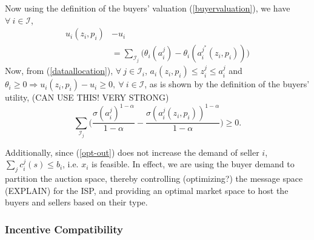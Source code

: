 \documentclass[12pt]{article}
\theoremstyle{definition}
\newcommand{\mcI}{\mathcal{I}}
\begin{document}
\begin{multicols}{2}
Now using the definition of
the buyers' valuation (\ref{buyervaluation}), we have $\forall \ i \in\mcI$,
\begin{align*}
    u_i(z_i,p_i) &- u_i \\
    &=\displaystyle\sum_{\mcI_j}\bigg(\theta_i(a_i^j)-
\theta_i(a_i^{j^*}(z_i,p_i))\bigg) 
\end{align*}
Now, from (\ref{dataallocation}), $\forall \ j\in\mcI_i$, $a_i(z_i,p_i) \le
z_i^j \le a_i^j$ and $\theta_i\ge 0 \Rightarrow u_i(z_i,p_i) - u_i \ge 0,
\ \forall \ i\in \mcI$, as is shown by the definition of the buyers' utility,
(CAN USE THIS! VERY STRONG)
$$
     \sum_{\mcI_j}\bigg(\frac{\sigma (a_i^j)^{1-\alpha}}{1-\alpha}
-\frac{\sigma (a_i^j(z_i,p_i))^{1-\alpha}}{1-\alpha}\bigg)
     \ge 0.
$$

Additionally, since (\ref{opt-out}) does
not increase the demand of seller $i$, $\sum_j c_i^j(s) \le b_i$, i.e. $x_i$ is feasible.
In effect, we are using the buyer demand
to partition the auction space, thereby 
controlling (optimizing?) the message space (EXPLAIN) for the
ISP, and providing an optimal market space to host the buyers and sellers based
on their type. \\

\subsubsection{Incentive Compatibility}


\end{multicols}
\end{document}
